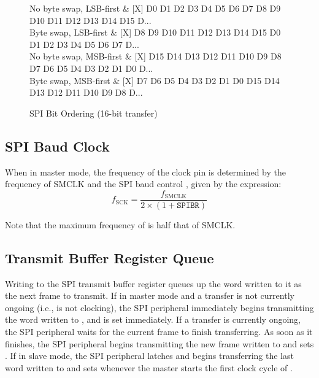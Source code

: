 \begin{figure}[htpb]
	\begin{tikztimingtable}[timing/font=\rmfamily, timing/d/text/.append style={font=\rmfamily}, xscale=2, timing/slope=0.1, timing/dslope=0.2]
		No byte swap, LSB-first & [X] D{0} D{1} D{2} D{3} D{4} D{5} D{6} D{7} D{8} D{9} D{10} D{11} D{12} D{13} D{14} D{15} D{...} \\
		Byte swap, LSB-first    & [X] D{8} D{9} D{10} D{11} D{12} D{13} D{14} D{15} D{0} D{1} D{2} D{3} D{4} D{5} D{6} D{7} D{...} \\
		No byte swap, MSB-first & [X] D{15} D{14} D{13} D{12} D{11} D{10} D{9} D{8} D{7} D{6} D{5} D{4} D{3} D{2} D{1} D{0} D{...} \\
		Byte swap, MSB-first    & [X] D{7} D{6} D{5} D{4} D{3} D{2} D{1} D{0} D{15} D{14} D{13} D{12} D{11} D{10} D{9} D{8} D{...} \\
	\end{tikztimingtable}
	\caption{SPI Bit Ordering (16-bit transfer)}
	\label{fig:spi-bit-ordering}
\end{figure}



\subsection{SPI Baud Clock}

When in master mode, the frequency of the  clock pin is determined by the frequency of SMCLK and the SPI baud control , given by the expression:
\begin{equation*}
f_\textrm{SCK} = \frac{f_\textrm{SMCLK}}{2 \times (1 + \texttt{SPIBR})}
\end{equation*}

Note that the maximum frequency of  is half that of SMCLK.


\subsection{Transmit Buffer Register Queue}

Writing to the SPI transmit buffer register  queues up the word written to it as the next frame to transmit. If in master mode and a transfer is not currently ongoing (i.e.,  is not clocking), the SPI peripheral immediately begins transmitting the word written to , and  is set immediately. If a transfer is currently ongoing, the SPI peripheral waits for the current frame to finish transferring. As soon as it finishes, the SPI peripheral begins transmitting the new frame written to  and sets . If in slave mode, the SPI peripheral latches and begins transferring the last word written to  and sets  whenever the master starts the first clock cycle of .


